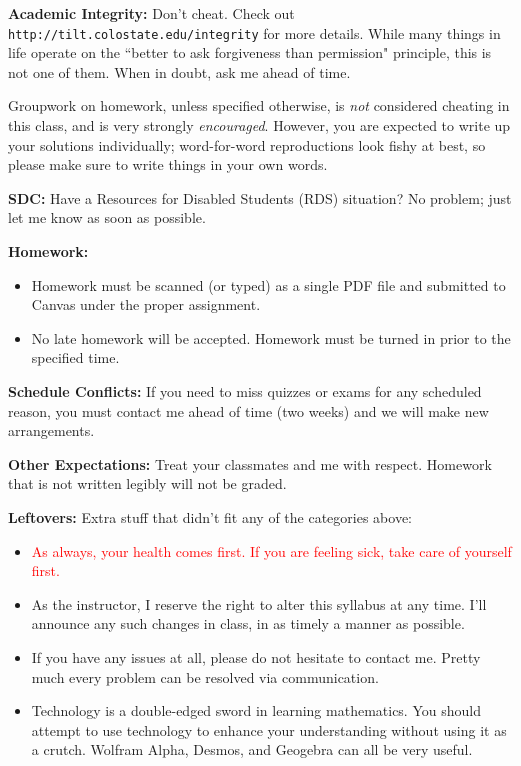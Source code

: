 \documentclass[12pt]{amsbook}
\begin{document}
\textbf{Academic Integrity:} Don't cheat. Check out \texttt{http://tilt.colostate.edu/integrity} for more details. While many things in life operate on the ``better to ask forgiveness than permission" principle, this is not one of them. When in doubt, ask me ahead of time.

Groupwork on homework, unless specified otherwise, is \emph{not} considered cheating in this class, and is very strongly \emph{encouraged}. However, you are expected to write up your solutions individually; word-for-word reproductions look fishy at best, so please make sure to write things in your own words.

\textbf{SDC:} Have a Resources for Disabled Students (RDS) situation? No problem; just let me know as soon as possible.

\textbf{Homework:} 
\begin{itemize}
    \item Homework must be scanned (or typed) as a single PDF file and submitted to Canvas under the proper assignment.
    \item No late homework will be accepted.  Homework must be turned in prior to the specified time.
\end{itemize}

\textbf{Schedule Conflicts:} If you need to miss quizzes or exams for any scheduled reason, you must contact me ahead of time (two weeks) and we will make new arrangements. 

\textbf{Other Expectations:} Treat your classmates and me with respect. Homework that is not written legibly will not be graded.

\textbf{Leftovers:} Extra stuff that didn't fit any of the categories above:
\begin{itemize}
\item \textcolor{red}{As always, your health comes first.  If you are feeling sick, take care of yourself first.}
\item As the instructor, I reserve the right to alter this syllabus at any time. I'll announce any such changes in class, in as timely a manner as possible. 
\item If you have any issues at all, please do not hesitate to contact me. Pretty much every  problem can be resolved via communication.
\item Technology is a double-edged sword in learning mathematics. You should attempt to use technology to enhance your understanding without using it as a crutch. Wolfram Alpha, Desmos, and Geogebra can all be very useful. 
\end{itemize}
\end{document}
